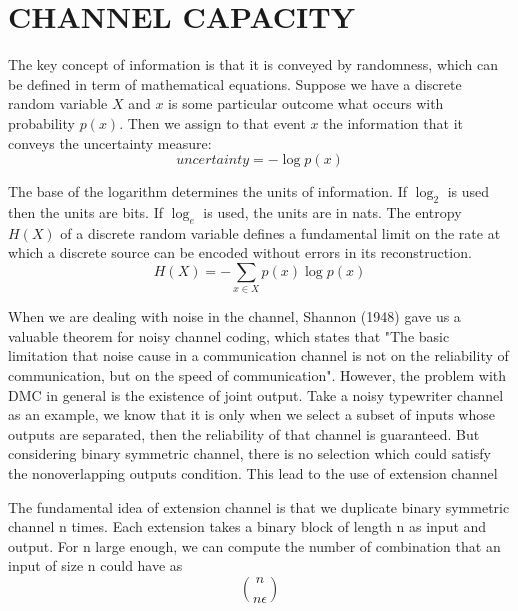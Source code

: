 \documentclass[a4paper, 13pt]{report}
\begin{document}
\chapter{CHANNEL CAPACITY}
\par The key concept of information is that it is conveyed by randomness, which can be defined in term of mathematical equations. Suppose we have a discrete random variable $X$ and $x$ is some particular outcome what occurs with probability $p(x)$. Then we assign to that event $x$ the information that it conveys the uncertainty measure:
\begin{equation}
    uncertainty = -\log p(x)
\end{equation}
\par The base of the logarithm determines the units of information. If $\log_{2}$ is used then the units are bits. If $\log_{e}$ is used, the units are in nats.
The entropy $H(X)$ of a discrete random variable defines a fundamental limit on the rate at which a discrete source can be encoded without errors in its reconstruction.
\begin{equation}
    H(X)=-\sum_{x\in X}p(x)\log p(x)
\end{equation}
\par When we are dealing with noise in the channel, Shannon (1948) gave us a valuable theorem for noisy channel coding, which states that "The basic limitation that noise cause in a communication channel is not on the reliability of communication, but on the speed of communication". However, the problem with DMC in general is the existence of joint output. Take a noisy typewriter channel as an example, we know that it is only when we select a subset of inputs whose outputs are separated, then the reliability of that channel is guaranteed. But considering binary symmetric channel, there is no selection which could satisfy the nonoverlapping outputs condition. This lead to the use of extension channel 
\par The fundamental idea of extension channel is that we duplicate binary symmetric channel n times. Each extension takes a binary block of length n as input and output. For n large enough, we can compute the number of combination that an input of size n could have as
\begin{equation}
    \binom{n}{n\epsilon}
\end{equation}
\end{document}
